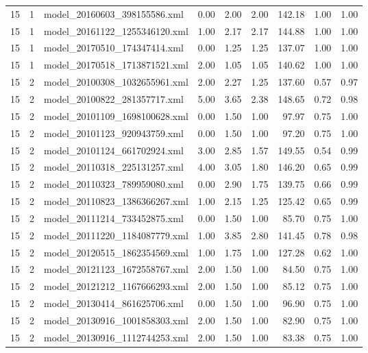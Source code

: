 \begin{table}[ht]
\begin{tabular}{rrlrrrrrr}
   15 &   1 & model\_20160603\_398155586.xml & 0.00 & 2.00 & 2.00 & 142.18 & 1.00 & 1.00 \\ 
   15 &   1 & model\_20161122\_1255346120.xml & 1.00 & 2.17 & 2.17 & 144.88 & 1.00 & 1.00 \\ 
   15 &   1 & model\_20170510\_174347414.xml & 0.00 & 1.25 & 1.25 & 137.07 & 1.00 & 1.00 \\ 
   15 &   1 & model\_20170518\_1713871521.xml & 2.00 & 1.05 & 1.05 & 140.62 & 1.00 & 1.00 \\ 
   15 &   2 & model\_20100308\_1032655961.xml & 2.00 & 2.27 & 1.25 & 137.60 & 0.57 & 0.97 \\ 
   15 &   2 & model\_20100822\_281357717.xml & 5.00 & 3.65 & 2.38 & 148.65 & 0.72 & 0.98 \\ 
   15 &   2 & model\_20101109\_1698100628.xml & 0.00 & 1.50 & 1.00 & 97.97 & 0.75 & 1.00 \\ 
   15 &   2 & model\_20101123\_920943759.xml & 0.00 & 1.50 & 1.00 & 97.20 & 0.75 & 1.00 \\ 
   15 &   2 & model\_20101124\_661702924.xml & 3.00 & 2.85 & 1.57 & 149.55 & 0.54 & 0.99 \\ 
   15 &   2 & model\_20110318\_225131257.xml & 4.00 & 3.05 & 1.80 & 146.20 & 0.65 & 0.99 \\ 
   15 &   2 & model\_20110323\_789959080.xml & 0.00 & 2.90 & 1.75 & 139.75 & 0.66 & 0.99 \\ 
   15 &   2 & model\_20110823\_1386366267.xml & 1.00 & 2.15 & 1.25 & 125.42 & 0.65 & 0.99 \\ 
   15 &   2 & model\_20111214\_733452875.xml & 0.00 & 1.50 & 1.00 & 85.70 & 0.75 & 1.00 \\ 
   15 &   2 & model\_20111220\_1184087779.xml & 1.00 & 3.85 & 2.80 & 141.45 & 0.78 & 0.98 \\ 
   15 &   2 & model\_20120515\_1862354569.xml & 1.00 & 1.75 & 1.00 & 127.28 & 0.62 & 1.00 \\ 
   15 &   2 & model\_20121123\_1672558767.xml & 2.00 & 1.50 & 1.00 & 84.50 & 0.75 & 1.00 \\ 
   15 &   2 & model\_20121212\_1167666293.xml & 2.00 & 1.50 & 1.00 & 85.12 & 0.75 & 1.00 \\ 
   15 &   2 & model\_20130414\_861625706.xml & 0.00 & 1.50 & 1.00 & 96.90 & 0.75 & 1.00 \\ 
   15 &   2 & model\_20130916\_1001858303.xml & 2.00 & 1.50 & 1.00 & 82.90 & 0.75 & 1.00 \\ 
   15 &   2 & model\_20130916\_1112744253.xml & 2.00 & 1.50 & 1.00 & 83.38 & 0.75 & 1.00 \\ 

\end{tabular}
\end{table}
